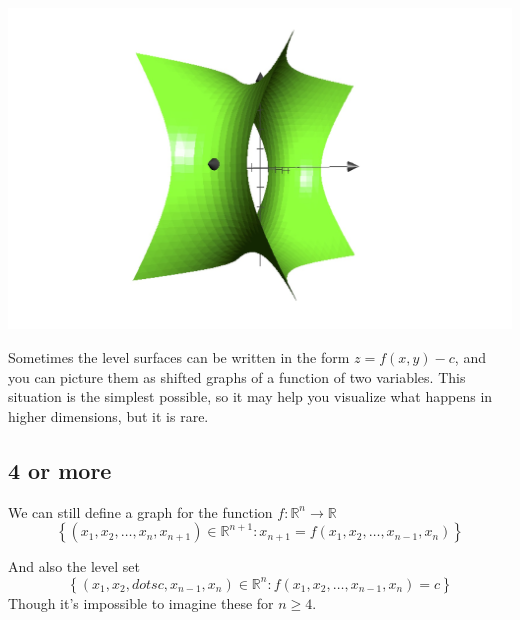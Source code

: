 \documentclass[11pt]{book}
\begin{document}
\begin{center}
    \includegraphics[width=\textwidth]{assets/-2-surf.jpg} 
\end{center}

Sometimes the level surfaces can be written in the form $z=f(x,y)-c$, and you can picture them as shifted graphs of a function of two variables. This situation is the simplest possible, so it may help you visualize what happens in higher dimensions, but it is rare.



\subsection{4 or more}%
\label{sub:4_or_more}

We can still define a graph for the function $f : \mathbb{R} ^{n}  \to \mathbb{R}  $ 
\[
    \left\{ \left( x_{1} , x_{2} , \dotsc  , x_{n } , x_{n + 1}  \right) \in \mathbb{R} ^{n + 1} : x_{n + 1} = f\left(x_{1} , x_{2} , \dotsc  , x_{n - 1} , x_{n} \right)   \right\} 
\]

And also the level set
\[
    \left\{ \left( x_{1} ,  x_{2} ,  dotsc ,  x_{n - 1} ,  x_{n}  \right) \in \mathbb{R} ^{n} : f\left(x_{1} , x_{2} , \dotsc  , x_{n - 1} , x_{n} \right) = c \right\} 
\]
Though it's impossible to imagine these for $n\ge 4$. 




\end{document}
